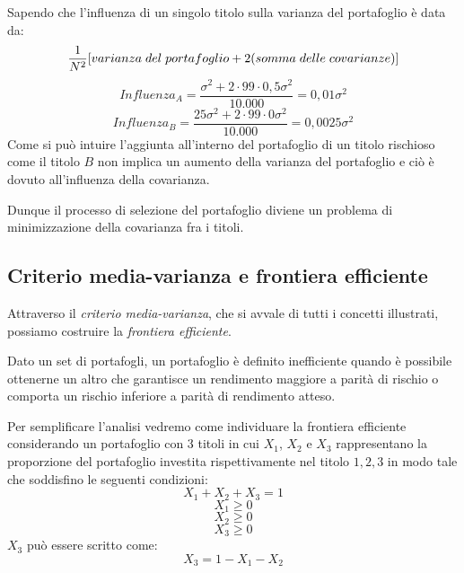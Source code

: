 Sapendo che l'influenza di un singolo titolo sulla varianza del portafoglio è data da: 
\begin{equation}
\dfrac{1}{N^2}[varianza \hspace{0,1cm}del\hspace{0,1cm} portafoglio + 2(somma \hspace{0,1cm}delle \hspace{0,1cm}covarianze)]
\end{equation}
\begin{equation}
Influenza_A= \frac{\sigma^{2}+2\cdot99\cdot0,5\sigma^{2}}{10.000}=0,01\sigma^{2}
\end{equation}
\begin{equation}
Influenza_B= \frac{25\sigma^{2}+2\cdot99\cdot0\sigma^{2}}{10.000}=0,0025\sigma^{2}
\end{equation}
Come si può intuire l'aggiunta all'interno del portafoglio di un titolo rischioso come il titolo $B$ non implica un aumento della varianza del portafoglio e ciò è dovuto all'influenza della covarianza.

Dunque il processo di selezione del portafoglio diviene un problema di minimizzazione della covarianza fra i titoli.

\subsection{Criterio media-varianza e frontiera efficiente}
Attraverso il \textit{criterio media-varianza}, che si avvale di tutti i concetti illustrati, possiamo costruire la \textit{frontiera efficiente}. 

Dato un set di portafogli, un portafoglio è definito inefficiente quando è possibile ottenerne un altro che garantisce un rendimento maggiore a parità di rischio o comporta un rischio inferiore a parità di rendimento atteso. 

Per semplificare l'analisi vedremo come individuare la frontiera efficiente considerando un portafoglio con 3 titoli in cui $X_{1}$, $X_{2}$ e $X_{3}$ rappresentano la proporzione del portafoglio investita rispettivamente nel titolo $1,2,3$ in modo tale che soddisfino le seguenti condizioni: 
\begin{equation}
\label{Condizioneparia1}
X_{1}+X_{2} + X_{3}=1
\end{equation}
\begin{equation}
X_{1} \geq  0
\nonumber
\end{equation}
\begin{equation}
X_{2}\geq  0
\nonumber
\end{equation}
\begin{equation}
X_{3}\geq  0
\end{equation}
$X_{3}$ può essere scritto come:
\begin{equation}
X_{3}= 1- X_{1}- X_{2}
\end{equation}

